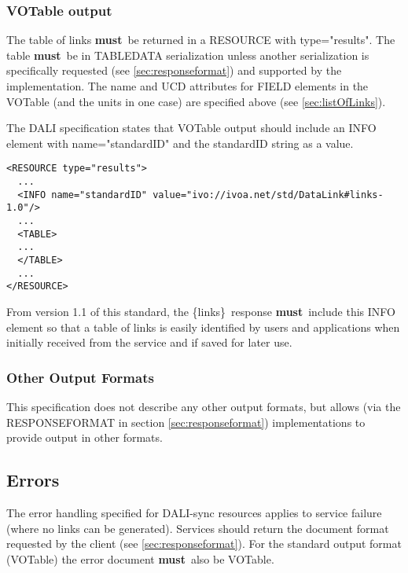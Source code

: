 \documentclass[11pt,a4paper]{ivoa}
\newcommand{\blinks}{\{links\}}
\newcommand{\attval}[2]{#1={\allowbreak}{"}#2{"}}
\newcommand{\rfcmust}{\textbf{must}}
\begin{document}
\subsubsection{VOTable output}

The table of links \rfcmust\ be returned in a RESOURCE with
\attval{type}{results}. The table \rfcmust\ be in TABLEDATA serialization
unless another serialization is specifically requested
(see \ref{sec:responseformat})
and supported by the implementation.
The name and UCD attributes for FIELD elements in the VOTable
(and the units in one case) are specified above (see \ref{sec:listOfLinks}).

The DALI specification states that VOTable output should include an
INFO element with \attval{name}{standardID} and the standardID string as a value.
\begin{verbatim}
<RESOURCE type="results">
  ... 
  <INFO name="standardID" value="ivo://ivoa.net/std/DataLink#links-1.0"/> 
  ... 
  <TABLE>
  ...
  </TABLE>
  ...
</RESOURCE>
\end{verbatim}
From version 1.1 of this standard, the \blinks\ response \rfcmust\ include this 
INFO element so that a table of links is easily identified by users and applications 
when initially received from the service and if saved for later use.

\subsubsection{Other Output Formats}

This specification does not describe any other output formats, but allows
(via the RESPONSEFORMAT in section \ref{sec:responseformat})
implementations to provide
output in other formats.


\subsection{Errors}

The error handling specified for DALI-sync resources applies
to service failure (where no links can be generated).
Services should return the
document format requested by the client (see \ref{sec:responseformat}).
For the standard
output format (VOTable) the error document \rfcmust\ also be VOTable.
\end{document}
